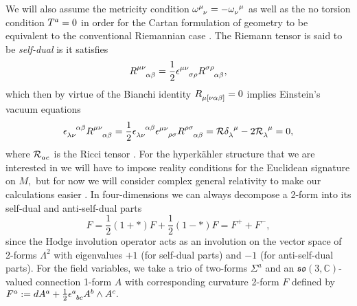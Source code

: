 \documentclass[a4paper,12pt, onecolumn, notitlepage]{article}
\theoremstyle{definition}
\theoremstyle{remark}
\newcommand{\al}{\alpha}
\newcommand{\w}{\omega}
\newcommand{\m}{\mu}
\newcommand{\n}{\nu}
\newcommand{\e}{\epsilon}
\newcommand{\HK}{hyperk\"ahler }
\begin{document}
We will also assume the metricity condition $\w\indices{^\m_\n}=-\w\indices{_\n^\m}$ as well as the no torsion condition $T\indices{^a}=0$ in order for the Cartan formulation of geometry to be equivalent to the conventional Riemannian case \cite{eguchi_1980}. The Riemann tensor is said to be \emph{self-dual} is it satisfies
\begin{equation}
	R\indices{^\m^\n_\al_\beta} = \frac{1}{2}\e\indices{^\m^\n_\sigma_\rho}R\indices{^\sigma^\rho_\al_\beta},
\end{equation}
which then by virtue of the Bianchi identity $R\indices{_\m_{[\n\al\beta]}}=0$ implies Einstein's vacuum equations
\begin{equation}
	\e\indices{_{\lambda\n}^{\al\beta}}R\indices{^{\m\n}_{\al\beta}}=\frac{1}{2}\e\indices{_{\lambda\n}^{\al\beta}}\e\indices{^{\m\n}_{\rho\sigma}}R\indices{^{\rho\sigma}_{\al\beta}}= \mathcal{R}\delta\indices{_{\lambda}^\m}-2\mathcal{R}\indices{_\lambda^\m}=0,
\end{equation}
where $\mathcal{R}\indices{_{ae}}$ is the Ricci tensor \cite{eguchi_1980}.
For the \HK structure that we are interested in we will have to impose reality conditions for the Euclidean signature on $M,$ but for now we will consider complex general relativity to make our calculations easier \cite{capovilla_1993}. In four-dimensions we can always decompose a 2-form into its self-dual and anti-self-dual parts
\begin{equation}
	F = \frac{1}{2}(1+\ast)F + \frac{1}{2}(1-\ast)F = F^{+} + F^{-},
\end{equation}
since the Hodge involution operator acts as an involution on the vector space of 2-forms $\Lambda^{2}$ with eigenvalues $+1$ (for self-dual parts) and $-1$ (for anti-self-dual parts).
For the field variables, we take a trio of two-forms $\Sigma^{a}$ and an $\mathfrak{so}(3,\mathbb{C})$-valued connection 1-form $A$ with corresponding curvature 2-form $F$ defined by $F\indices{^a}:=dA\indices{^a}+\frac{1}{2}\e\indices{^a_b_c}A\indices{^b}\wedge A\indices{^c}.$\\
\end{document}
